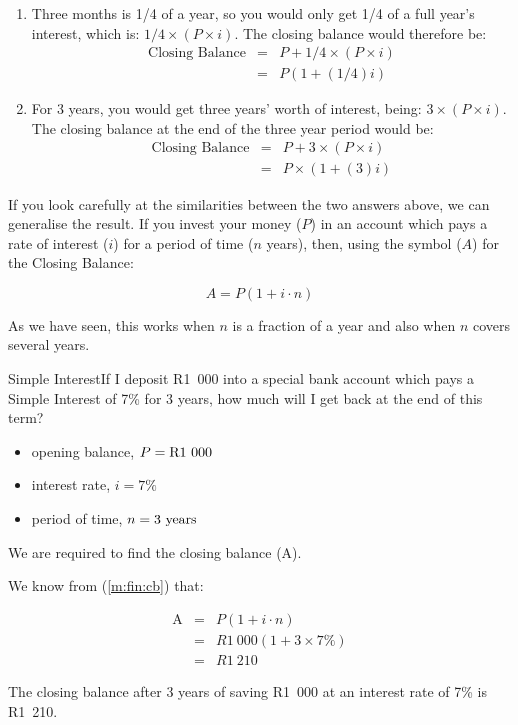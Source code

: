 \documentclass[10pt,a4paper,titlepage,twoside,openright]{report}
\begin{document}
\begin{enumerate}[topsep=0ex, partopsep=\parskip,itemsep=\parskip]
\item{Three months is 1/4 of a year, so you would only get 1/4 of a full year's interest, which is: $1/4 \times (P \times i)$. The closing balance would therefore be:
\begin{eqnarray*}
\mbox{Closing Balance} &=& P + 1/4 \times (P \times i)\\
&=& P(1 + (1/4)i)
\end{eqnarray*}}

\item{For 3 years, you would get three years' worth of interest, being: $3\times(P \times i)$. The closing balance at the end of the three year period would be:
\begin{eqnarray*}
\mbox{Closing Balance} &=& P + 3 \times (P \times i)\\
&=& P\times (1 + (3)i)
\end{eqnarray*}}
\end{enumerate}

If you look carefully at the similarities between the two answers above, we can generalise the result. If you invest your money ($P$) in an account which pays a rate of interest ($i$) for a period of time ($n$ years), then, using the symbol ($A$) for the Closing Balance:

\begin{equation}
\label{m:fin:cb}
A = P (1 + i\cdot n)
\end{equation}

As we have seen, this works when $n$ is a fraction of a year and also when $n$ covers several years.


\begin{wex}{Simple Interest}{If I deposit R1~000 into a special bank account which pays a Simple Interest of 7\% for 3 years, how much will I get back at the end of this term?}{
\begin{itemize}[topsep=0ex, partopsep=\parskip,itemsep=\parskip]
\item{opening balance, $P=\rm{R}1~000$}
\item{interest rate, $i=7\%$}
\item{period of time, $n=3~\rm{years}$}
\end{itemize}
We are required to find the closing balance (A).

We know from (\ref{m:fin:cb}) that:

\begin{eqnarray*}
\mbox{A} &=& P (1 + i\cdot n)\\
&=& R1~000 (1 + 3\times 7\%)\\
&=& R1~210
\end{eqnarray*}

The closing balance after 3 years of saving R1~000 at an interest rate of 7\% is R1~210.}
\end{wex}
\end{document}
